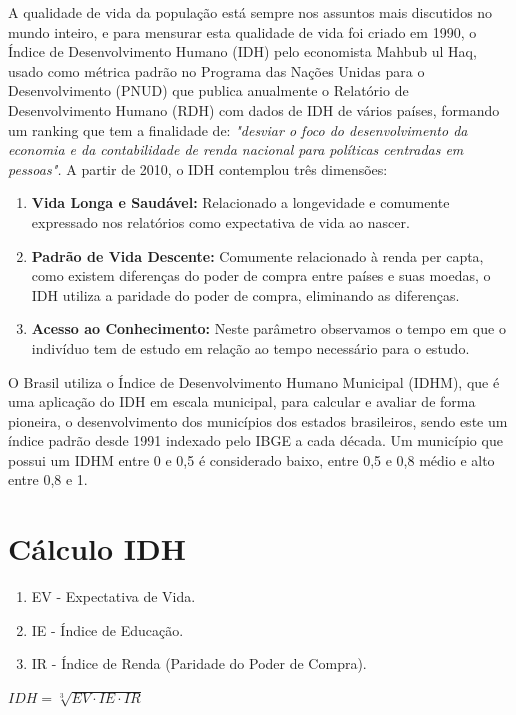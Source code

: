 \documentclass[10pt,foldmark,notumble]{leaflet}
\begin{document}
A qualidade de vida da população está sempre nos assuntos mais discutidos no mundo inteiro, e para mensurar esta qualidade de vida foi criado em 1990, o Índice de Desenvolvimento Humano (IDH) pelo economista Mahbub ul Haq\cite{PNUD2017}\cite{Licia2009}\cite{loureiroimpacto}, usado como métrica padrão no Programa das Nações Unidas para o Desenvolvimento (PNUD) que publica anualmente o Relatório de Desenvolvimento Humano (RDH) com dados de IDH de vários países, formando um ranking\cite{PNUD2017} que tem a finalidade de: \emph{"desviar o foco do desenvolvimento da economia e da contabilidade de renda nacional para políticas centradas em pessoas\cite{Haq1995}".}
A partir de 2010, o IDH contemplou três dimensões\cite{Atlas2017}\cite{Licia2009}:

\begin{enumerate}
\item  {\textbf{Vida Longa e Saudável:} Relacionado a longevidade e comumente expressado nos relatórios como expectativa de vida ao nascer.}
\item  {\textbf{Padrão de Vida Descente:} Comumente relacionado à renda per capta, como existem diferenças do poder de compra entre países e suas moedas, o IDH utiliza a paridade do poder de compra, eliminando as diferenças.\cite{Licia2009}}
\item  {\textbf{Acesso ao Conhecimento:} Neste parâmetro observamos o tempo em que o indivíduo tem de estudo em relação ao tempo necessário para o estudo.}
\end{enumerate}

O Brasil utiliza o Índice de Desenvolvimento Humano Municipal (IDHM), que é uma aplicação do IDH em escala municipal, para calcular e avaliar de forma pioneira, o desenvolvimento dos municípios dos estados brasileiros, sendo este um índice padrão desde 1991 indexado pelo IBGE a cada década. Um município que possui um IDHM entre 0 e 0,5 é considerado baixo, entre 0,5 e 0,8 médio e alto entre 0,8 e 1.\cite{IBGE2017}\cite{Atlas2017}

\section{Cálculo IDH}

\begin{enumerate}
			\item EV - Expectativa de Vida.
			\item IE - Índice de Educação.
			\item IR - Índice de Renda (Paridade do Poder de Compra).
		\end{enumerate}
\vspace{15pt}        
\begin{center}
                    $IDH = \sqrt[3] {EV \cdot IE \cdot IR}$
           \end{center}
\end{document}
